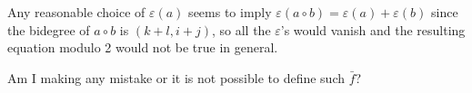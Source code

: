 \documentclass[twoside]{article}
\begin{document}
Any reasonable choice of $\varepsilon(a)$ seems to imply $\varepsilon(a\circ b)=\varepsilon(a)+\varepsilon(b)$ since the bidegree of $a\circ b$ is $(k+l,i+j)$, so all the $\varepsilon$'s would vanish and the resulting equation modulo 2 would not be true in general.

Am I making any mistake or it is not possible to define such $\bar{f}$?


%
%
%
%
%
%
%
%
%
%
\end{document}
